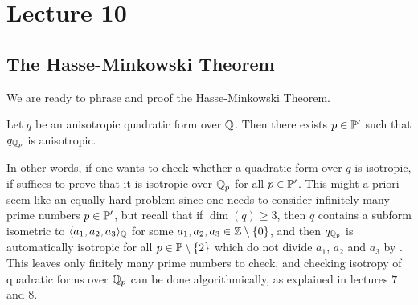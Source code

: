 \documentclass[12pt, leqno, british]{amsart}
\author{Nicolas Daans}
\begin{document}
\section{Lecture 10}

\subsection{The Hasse-Minkowski Theorem}
We are ready to phrase and proof the Hasse-Minkowski Theorem.
\begin{thm}\label{T:Hasse-Minkowski}
Let $q$ be an anisotropic quadratic form over $\mathbb Q$.
Then there exists $p \in \mathbb P'$ such that $q_{\mathbb Q_p}$ is anisotropic.
\end{thm}
In other words, if one wants to check whether a quadratic form over $q$ is isotropic, if suffices to prove that it is isotropic over $\mathbb Q_p$ for all $p \in \mathbb P'$.
This might a priori seem like an equally hard problem since one needs to consider infinitely many prime numbers $p \in \mathbb P'$, but recall that if $\dim(q) \geq 3$, then $q$ contains a subform isometric to $\langle a_1, a_2, a_3 \rangle_\mathbb Q$ for some $a_1, a_2, a_3 \in \mathbb Z \setminus \lbrace 0 \rbrace$, and then $q_{\mathbb Q_p}$ is automatically isotropic for all $p \in \mathbb P \setminus \lbrace 2 \rbrace$ which do not divide $a_1$, $a_2$ and $a_3$ by .
This leaves only finitely many prime numbers to check, and checking isotropy of quadratic forms over $\mathbb Q_p$ can be done algorithmically, as explained in lectures $7$ and $8$.
\end{document}
